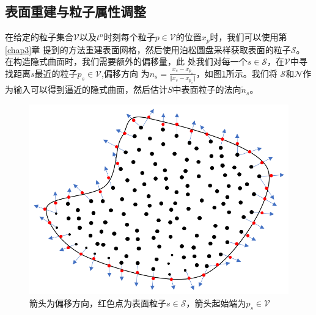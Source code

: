\subsection{表面重建与粒子属性调整}
在给定的粒子集合$\mathcal{V}$以及$t^n$时刻每个粒子$p \in \mathcal{V}$的位置$x_p$时，我们可以使用第\ref{chap3}章
提到的方法重建表面网格，然后使用泊松圆盘采样获取表面的粒子$\mathcal{S}$。在构造隐式曲面时，我们需要额外的偏移量，此
处我们对每一个$s\in \mathcal{S}$，在$\mathcal{V}$中寻找距离$s$最近的粒子$p_s \in \mathcal{V}$,偏移方向
为$n_s = \frac{x_s - x_{p_s}}{\Vert x_s - x_{p_s} \Vert}$，如图\ref{fig: offset of surface particle}所示。我们将
$\mathcal{S}$和$\mathcal{N}$作为输入可以得到逼近的隐式曲面，然后估计$S$中表面粒子的法向$\tilde{n}_s$。
\begin{figure}[htbp]
    \centering
    \includegraphics[scale=0.7]{./images/image15.png}
    \caption{箭头为偏移方向，红色点为表面粒子$s\in \mathcal{S}$，箭头起始端为$p_s \in\mathcal{V}$}
    \label{fig: offset of surface particle}
\end{figure}

